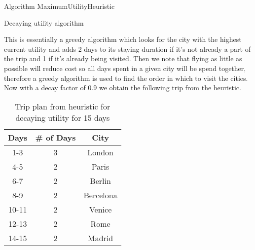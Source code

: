 \documentclass[a4paper]{article}
\begin{document}
\begin{algorithm}[h!]
\begin{algorithmic}[1]
\STATE Algorithm MaximumUtilityHeuristic
	\ELSE
	\ENDIF
\ENDWHILE
{}
\ENDWHILE
{}
\end{algorithmic}
\caption{Decaying utility algorithm}
\label{alg:bstSearch}
\end{algorithm}
This is essentially a greedy algorithm which looks for the city with the highest current utility and adds 2 days to its staying duration if it's not already a part of the trip and 1 if it's already being visited. Then we note that flying as little as possible will reduce cost so all days spent in a given city will be spend together, therefore a greedy algorithm is used to find the order in which to visit the cities. Now with a decay factor of $0.9$ we obtain the following trip from the heuristic.
\begin{table}[h]
\caption{Trip plan from heuristic for decaying utility for 15 days}
\centering
\begin{tabular}{c|c|c}
	\hline
	\rule{0pt}{2ex} Days & \# of Days & City \\
	\hline
	1-3 & 3 & London \\
	4-5 & 2 & Paris \\
	6-7 & 2 & Berlin \\
	8-9 & 2 & Bercelona \\
	10-11 & 2 & Venice \\
	12-13 & 2 & Rome \\
	14-15 & 2 & Madrid \\
	\hline
\end{tabular}
\vspace{1mm}
\end{table}\\
\end{document}
